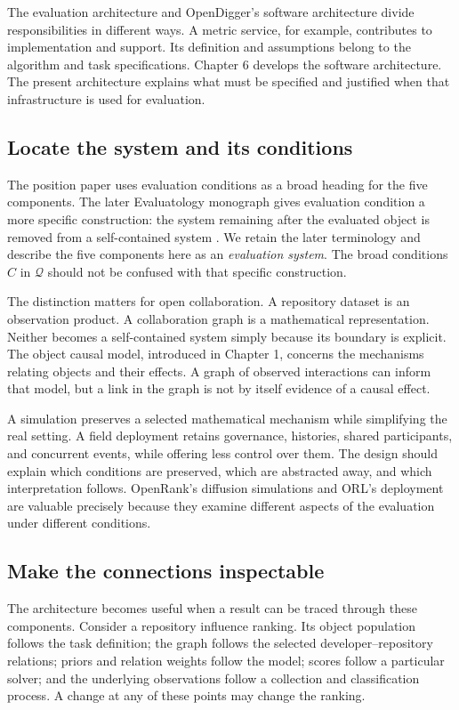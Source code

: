 The evaluation architecture and OpenDigger's software architecture divide responsibilities in different ways. A metric service, for example, contributes to implementation and support. Its definition and assumptions belong to the algorithm and task specifications. Chapter 6 develops the software architecture. The present architecture explains what must be specified and justified when that infrastructure is used for evaluation.

\subsection{Locate the system and its conditions}
The position paper uses evaluation conditions as a broad heading for the five components. The later Evaluatology monograph gives evaluation condition a more specific construction: the system remaining after the evaluated object is removed from a self-contained system \citep[Sections 10.1--10.3]{zhan2026book}. We retain the later terminology and describe the five components here as an \emph{evaluation system}. The broad conditions \(C\) in \(\mathcal Q\) should not be confused with that specific construction.

The distinction matters for open collaboration. A repository dataset is an observation product. A collaboration graph is a mathematical representation. Neither becomes a self-contained system simply because its boundary is explicit. The object causal model, introduced in Chapter 1, concerns the mechanisms relating objects and their effects. A graph of observed interactions can inform that model, but a link in the graph is not by itself evidence of a causal effect.

A simulation preserves a selected mathematical mechanism while simplifying the real setting. A field deployment retains governance, histories, shared participants, and concurrent events, while offering less control over them. The design should explain which conditions are preserved, which are abstracted away, and which interpretation follows. OpenRank's diffusion simulations and ORL's deployment are valuable precisely because they examine different aspects of the evaluation under different conditions.

\subsection{Make the connections inspectable}
The architecture becomes useful when a result can be traced through these components. Consider a repository influence ranking. Its object population follows the task definition; the graph follows the selected developer--repository relations; priors and relation weights follow the model; scores follow a particular solver; and the underlying observations follow a collection and classification process. A change at any of these points may change the ranking.

